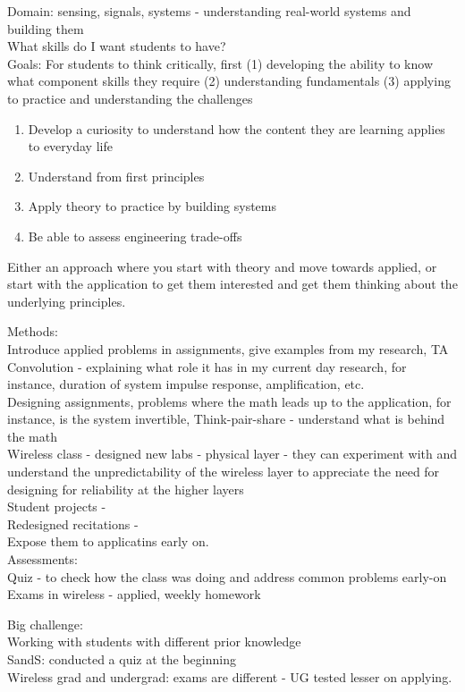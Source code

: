 \documentclass[10pt]{article}
\begin{document}
Domain: sensing, signals, systems - understanding real-world systems and building them\\

What skills do I want students to have?\\
Goals: For students to think critically, first (1) developing the ability to know what component skills they require (2) understanding fundamentals (3) applying to practice and understanding the challenges 
\begin{enumerate}
\item Develop a curiosity to understand how the content they are learning applies to everyday life
\item Understand from first principles
\item Apply theory to practice by building systems
\item Be able to assess engineering trade-offs
\end{enumerate}

Either an approach where you start with theory and move towards applied, or start with the application to get them interested and get them thinking about the underlying principles.

Methods:\\
Introduce applied problems in assignments, give examples from my research, TA\\
Convolution - explaining what role it has in my current day research, for instance, duration of system impulse response, amplification, etc.\\
Designing assignments, problems where the math leads up to the application, for instance, is the system invertible, 
Think-pair-share - understand what is behind the math\\
Wireless class - designed new labs - physical layer - they can experiment with and understand the unpredictability of the wireless layer to appreciate the need for designing for reliability at the higher layers\\
Student projects - \\
Redesigned recitations - \\
Expose them to applicatins early on.\\

Assessments:\\
Quiz - to check how the class was doing and address common problems early-on\\
Exams in wireless - applied, weekly homework 

Big challenge:\\
Working with students with different prior knowledge\\
SandS: conducted a quiz at the beginning\\
Wireless grad and undergrad: exams are different - UG tested lesser on applying.\\
\end{document}
